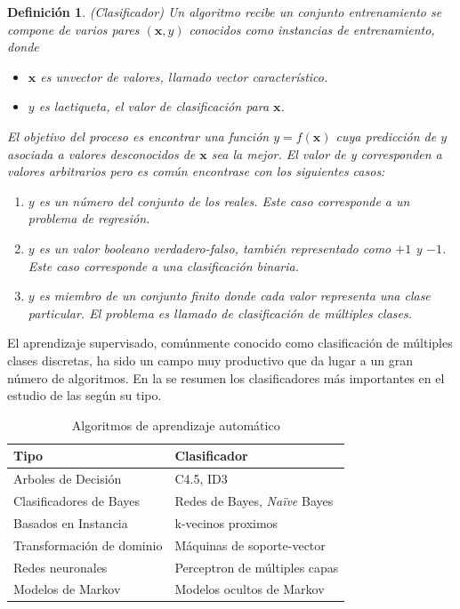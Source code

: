 \label{def3:clasificacion}\newtheorem{defs}{Definición}
\begin{defs}(Clasificador) Un algoritmo recibe un conjunto entrenamiento se compone de varios pares $(\boldsymbol{x},y)$ conocidos como instancias de entrenamiento, donde
\begin{itemize}
\item $\boldsymbol{x}$ es un\emph{vector} de valores, llamado vector característico.
\item $y$ es la\emph{etiqueta}, el valor de clasificación para $\boldsymbol{x}$.
\end{itemize}
El objetivo del proceso es encontrar una función $y=f(\boldsymbol{x})$ cuya predicción de $y$ asociada a valores desconocidos de $\boldsymbol{x}$ sea la mejor. El valor de y corresponden a valores arbitrarios pero es común encontrase con los siguientes casos:
\begin{enumerate}
\item $y$ es un número del conjunto de los reales. Este caso corresponde a un problema de regresión.
\item $y$ es un valor booleano verdadero-falso, también representado como $+1$ y $-1$. Este caso corresponde a una clasificación binaria. 
\item $y$ es miembro de un conjunto finito donde cada valor representa una clase particular. El problema es llamado de clasificación de múltiples clases.
\end{enumerate}
\end{defs}

El aprendizaje supervisado, comúnmente conocido como clasificación de múltiples clases discretas, ha sido un campo muy productivo que da lugar a un gran número de algoritmos. En la  se resumen los clasificadores más importantes en el estudio de las  según su tipo.
\begin{table}
\begin{centering}
\begin{tabular}{|l|l|}
\hline 
Tipo & Clasificador\tabularnewline
\hline 
\hline 
Arboles de Decisión & C4.5, ID3\tabularnewline
\hline 
Clasificadores de Bayes & Redes de Bayes, \emph{Naïve} Bayes\tabularnewline
\hline 
Basados en Instancia & k-vecinos proximos\tabularnewline
\hline 
Transformación de dominio & Máquinas de soporte-vector\tabularnewline
\hline 
Redes neuronales & Perceptron de múltiples capas\tabularnewline
\hline 
Modelos de Markov & Modelos ocultos de Markov\tabularnewline
\end{tabular}
\par\end{centering}
\caption[Algoritmos de ]{\label{tab3:clasificadores} Algoritmos de aprendizaje automático}
\end{table}


